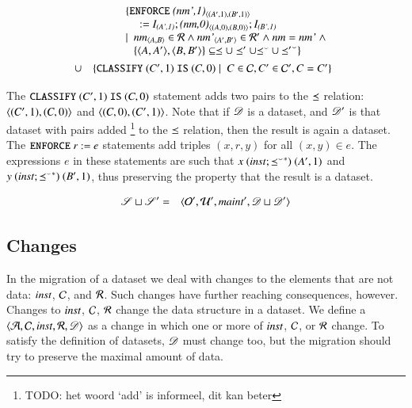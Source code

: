 \documentclass{elsarticle}
\begin{document}
\begin{definition}
   \begin{eqnarray}
      &&\begin{array}[t]{@{}l}
         \{ {\tt ENFORCE\ }\declare{(nm',1)}{(A',1)}{(B',1)}\\\quad{\tt\ :=\ }\ident{(A',1)};\declare{(nm,0)}{(A,0)}{(B,0)};\ident{(B',1)}\\
            \mid\ \begin{array}[t]{@{}l}
               \declare{nm}{A}{B}\in\rels\wedge\declare{nm'}{A'}{B'}\in\rels'\wedge\id{nm}=\id{nm'}\ \wedge\\
               \{\pair{A}{A'},\pair{B}{B'}\}\subseteq\isa\cup\isa'\cup\flip{\isa}\cup\flip{\isa'}\}
               \end{array}
           \end{array}\\
           &\cup&\begin{array}[t]{@{}l}
            \{ {\tt CLASSIFY\ }(C',1){\tt\ IS\ }(C,0)\mid\ C\in\concepts,C'\in\concepts',C=C'\}\\
           \end{array}
   \end{eqnarray}
\end{definition}

The ${\tt CLASSIFY\ }(C',1){\tt\ IS\ }(C,0)$ statement adds two pairs to the $\preceq$ relation:
$\langle{(C',1)},{(C,0)}\rangle$ and $\langle{(C,0)},{(C',1)}\rangle$.
Note that if $\mathscr{D}$ is a dataset, and $\mathscr{D}'$ is that dataset with pairs added%
\footnote{TODO: het woord `add' is informeel, dit kan beter} to the $\preceq$ relation, then the result is again a dataset.
The ${\tt ENFORCE\ }r{\tt\ :=\ }e$ statements add triples $(x,r,y)$ for all $(x,y)\in e$.
The expressions $e$ in these statements are such that $x\ (\mathbin{\text{\it inst\/}} ; {{\preceq}^\smallsmile}^*)\ (A',1)$ and $y \ (\inst \compose \kleenestar{\flip{\isa}})\ (B',1)$, thus preserving the property that the result is a dataset.

\begin{definition}[]
   \begin{eqnarray}
      \mathscr{S}\sqcup\mathscr{S}'&=&\langle{\mathcal{O}'},{\mathcal{U}'},{\mathbin{\text{\it maint\/}}'},{\mathscr{D}\sqcup\mathscr{D}'}\rangle
   \end{eqnarray}
\end{definition}

\subsection{Changes}
   In the migration of a dataset we deal with changes to the elements that are not data:
   $\mathbin{\text{\it inst\/}}$, $\mathcal{C}$, and $\mathcal{R}$.
   Such changes have further reaching consequences, however.
   Changes to $\mathbin{\text{\it inst\/}}$, $\mathcal{C}$, $\mathcal{R}$ change the data structure in a dataset.
   We define a  $\langle\mathcal{A},\mathcal{C},\mathbin{\text{\it inst\/}},\mathcal{R},\mathscr{D}\rangle$ as a change in which one or more of $\mathbin{\text{\it inst\/}}$, $\mathcal{C}$, or $\mathcal{R}$ change.
   To satisfy the definition of datasets, $\mathscr{D}$ must change too,
   but the migration should try to preserve the maximal amount of data.
\end{document}
